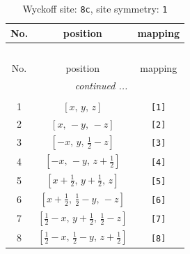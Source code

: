 \documentclass[fleqn,8pt]{jsarticle}
\begin{document}
\renewcommand{\arraystretch}{1.2}
\begin{longtable}{ccc}
\caption{Wyckoff site: {\tt 8c}, site symmetry: {\tt 1}}
 \\
 \hline \hline
No. & position & mapping \\ \hline \endfirsthead

\multicolumn{2}{l}{\tablename\ \thetable{}} \\
 \hline \hline
No. & position & mapping \\ \hline \endhead

 \hline \hline
\multicolumn{2}{r}{\footnotesize\it continued ...} \\ \endfoot

 \hline \hline
\multicolumn{2}{r}{} \\ \endlastfoot

1 & $\left[ x,\, y,\, z \right]$ & {\tt [1]} \\ \hline
2 & $\left[ x,\, - y,\, - z \right]$ & {\tt [2]} \\ \hline
3 & $\left[ - x,\, y,\, \frac{1}{2} - z \right]$ & {\tt [3]} \\ \hline
4 & $\left[ - x,\, - y,\, z + \frac{1}{2} \right]$ & {\tt [4]} \\ \hline
5 & $\left[ x + \frac{1}{2},\, y + \frac{1}{2},\, z \right]$ & {\tt [5]} \\ \hline
6 & $\left[ x + \frac{1}{2},\, \frac{1}{2} - y,\, - z \right]$ & {\tt [6]} \\ \hline
7 & $\left[ \frac{1}{2} - x,\, y + \frac{1}{2},\, \frac{1}{2} - z \right]$ & {\tt [7]} \\ \hline
8 & $\left[ \frac{1}{2} - x,\, \frac{1}{2} - y,\, z + \frac{1}{2} \right]$ & {\tt [8]} \\
\end{longtable}
\end{document}

